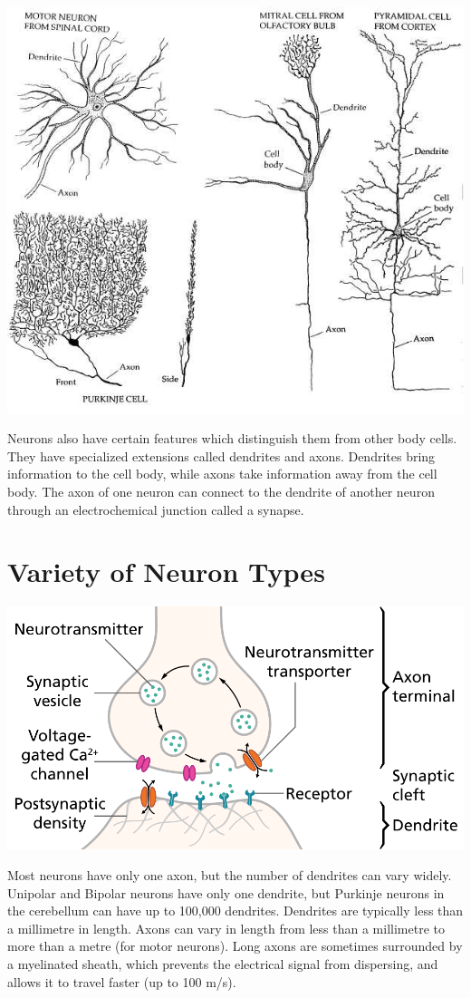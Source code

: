 \documentclass[11pt]{article}
\begin{document}
\includegraphics{img_6}

Neurons also have certain features which distinguish them from other body cells.
They have specialized extensions called dendrites and axons.
Dendrites bring information to the cell body, while axons take information away from the cell body.
The axon of one neuron can connect to the dendrite of another neuron through an electrochemical junction called a synapse.

\section{Variety of Neuron Types}\label{sec:variety-of-neuron-types}
\includegraphics{img_7}

Most neurons have only one axon, but the number of dendrites can vary widely.
Unipolar and Bipolar neurons have only one dendrite, but Purkinje neurons in the cerebellum can have up to 100,000 dendrites.
Dendrites are typically less than a millimetre in length.
Axons can vary in length from less than a millimetre to more than a metre (for motor neurons).
Long axons are sometimes surrounded by a myelinated sheath, which prevents the electrical signal from dispersing, and allows it to travel faster (up to 100 m/s).
\end{document}
